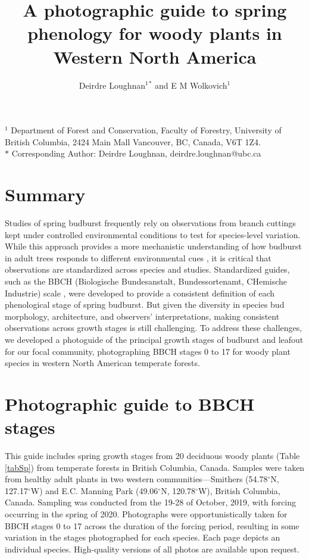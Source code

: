 \documentclass[12pt, letterpaper]{article}
\begin{document}
\renewcommand{\bibname}{References}%

\title{A photographic guide to spring phenology for woody plants in Western North America} %
\date{}
\author{Deirdre Loughnan$^1$$^\ast$ and E M Wolkovich$^1$} 
\maketitle 

$^1$ Department of Forest and Conservation, Faculty of Forestry, University of British Columbia, 2424 Main Mall 
Vancouver, BC, Canada, V6T 1Z4. \\

$\ast$ Corresponding Author: Deirdre Loughnan, deirdre.loughnan@ubc.ca \\

\section*{Summary}
Studies of spring budburst frequently rely on observations from branch cuttings kept under controlled environmental conditions to test for species-level variation. While this approach provides a more mechanistic understanding of how budburst in adult trees responds to different environmental cues \citep{Vitasse2014}, it is critical that observations are standardized across species and studies. Standardized guides, such as the BBCH (Biologische Bundesanstalt, Bundessortenamt, CHemische Industrie) scale \citep{Finn2007}, were developed to provide a consistent definition of each phenological stage of spring budburst. But given the diversity in species bud morphology, architecture, and observers' interpretations, making consistent observations across growth stages is still challenging.  To address these challenges, we developed a photoguide of the principal growth stages of budburst and leafout for our focal community, photographing BBCH stages 0 to 17 for woody plant species in western North American temperate forests. 

\section*{Photographic guide to BBCH stages}

This guide includes spring growth stages from 20 deciduous woody plants (Table \ref{tabSp}) from temperate forests in British Columbia, Canada. Samples were taken from healthy adult plants in two western communities---Smithers (54.78$^{\circ}$N, 127.17$^{\circ}$W) and E.C. Manning Park (49.06$^{\circ}$N, 120.78$^{\circ}$W), British Columbia, Canada. Sampling was conducted from the 19-28 of October, 2019, with forcing occurring in the spring of 2020. Photographs were opportunistically taken for BBCH stages 0 to 17 across the duration of the forcing period, resulting in some variation in the stages photographed for each species. Each page depicts an individual species. High-quality versions of all photos are available upon request.
\end{document}
